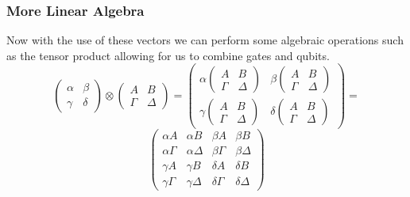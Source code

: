 \documentclass{beamer}
\begin{document}
\begin{frame}
\frametitle{More Linear Algebra}

Now with the use of these vectors we can perform some algebraic operations such as the tensor product allowing for us to combine gates and qubits.
\[
    \begin{pmatrix}
        \alpha & \beta\\
        \gamma & \delta
    \end{pmatrix}
    \otimes
    \begin{pmatrix}
        A & B\\
        \Gamma & \Delta
    \end{pmatrix}
    =
    \begin{pmatrix}
        \alpha 
        \begin{pmatrix}
            A & B\\
            \Gamma & \Delta
        \end{pmatrix} 
        & \beta
        \begin{pmatrix}
            A & B\\
            \Gamma & \Delta
        \end{pmatrix}
        \\
        \gamma
            \begin{pmatrix}
            A & B\\
            \Gamma & \Delta
        \end{pmatrix}
        & \delta
        \begin{pmatrix}
            A & B\\
            \Gamma & \Delta
        \end{pmatrix}
    \end{pmatrix}
    =
\]
\[
    \begin{pmatrix}
        \alpha A      & \alpha B      & \beta A      & \beta   B      \\
        \alpha \Gamma & \alpha \Delta & \beta \Gamma & \beta   \Delta \\
        \gamma A      & \gamma B      & \delta A     & \delta  B      \\
        \gamma \Gamma & \gamma \Delta & \delta \Gamma & \delta \Delta         
    \end{pmatrix}
\]

\end{frame}
\end{document}
